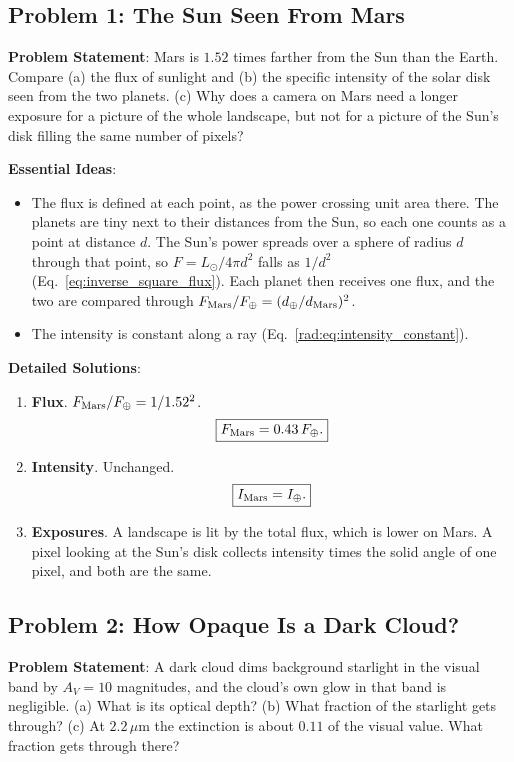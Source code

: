 \subsection{Problem 1: The Sun Seen From Mars}
\label{rad:prob:mars}

\textbf{Problem Statement}: Mars is $1.52$ times farther from the Sun than the Earth. Compare (a) the flux of sunlight and (b) the specific intensity of the solar disk seen from the two planets. (c) Why does a camera on Mars need a longer exposure for a picture of the whole landscape, but not for a picture of the Sun's disk filling the same number of pixels?

\textbf{Essential Ideas}:
\begin{itemize}
	\item The flux is defined at each point, as the power crossing unit area there. The planets are tiny next to their distances from the Sun, so each one counts as a point at distance $d$. The Sun's power spreads over a sphere of radius $d$ through that point, so $F=L_\odot/4\pi d^2$ falls as $1/d^2$ (Eq.~\eqref{eq:inverse_square_flux}). Each planet then receives one flux, and the two are compared through $F_{\rm Mars}/F_\oplus=(d_\oplus/d_{\rm Mars})^2$.
	\item The intensity is constant along a ray (Eq.~\eqref{rad:eq:intensity_constant}).
\end{itemize}

\textbf{Detailed Solutions}:
\begin{enumerate}[label=(\alph*)]
	\item \textbf{Flux}. $F_{\rm Mars}/F_\oplus=1/1.52^2$.
	\[
	\boxed{F_{\rm Mars}=0.43\,F_\oplus.}
	\]
	\item \textbf{Intensity}. Unchanged.
	\[
	\boxed{I_{\rm Mars}=I_\oplus.}
	\]
	\item \textbf{Exposures}. A landscape is lit by the total flux, which is lower on Mars. A pixel looking at the Sun's disk collects intensity times the solid angle of one pixel, and both are the same.
\end{enumerate}

\subsection{Problem 2: How Opaque Is a Dark Cloud?}
\label{rad:prob:cloud}

\textbf{Problem Statement}: A dark cloud dims background starlight in the visual band by $A_V=10$ magnitudes, and the cloud's own glow in that band is negligible. (a) What is its optical depth? (b) What fraction of the starlight gets through? (c) At $2.2\,\mu\mathrm m$ the extinction is about $0.11$ of the visual value. What fraction gets through there?


